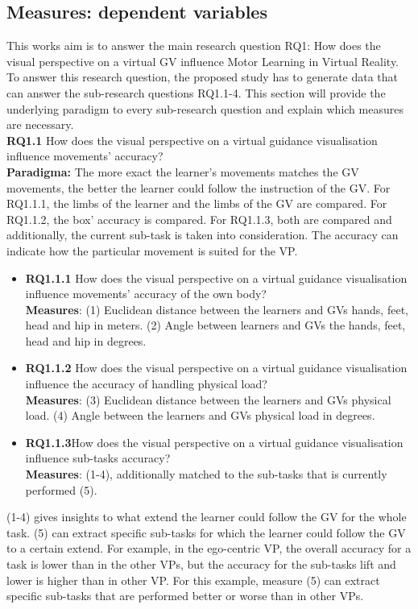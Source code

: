 \subsection{Measures: dependent variables}
\label{sec:measures}
This works aim is to answer the main research question RQ1: How does the visual perspective on a virtual GV influence Motor Learning in Virtual Reality. To answer this research question, the proposed study has to generate data that can answer the sub-research questions RQ1.1-4. This section will provide the underlying paradigm to every sub-research question and explain which measures are necessary.\\

\textbf{RQ1.1} How does the visual perspective on a virtual guidance visualisation influence movements' accuracy?\\
\textbf{Paradigma:} The more exact the learner's movements matches the GV movements, the better the learner could follow the instruction of the GV. For RQ1.1.1, the limbs of the learner and the limbs of the GV are compared. For RQ1.1.2, the box' accuracy is compared. For RQ1.1.3, both are compared and additionally, the current sub-task is taken into consideration. The accuracy can indicate how the particular movement is suited for the VP.
\begin{itemize}
	\item[] \textbf{RQ1.1.1} How does the visual perspective on a virtual guidance visualisation influence movements' accuracy of the own body?\\
	\textbf{Measures}: (1) Euclidean distance between the learners and GVs hands, feet, head and hip in meters. (2) Angle between learners and GVs the hands, feet, head and hip in degrees.
	
	\item[] \textbf{RQ1.1.2} How does the visual perspective on a virtual guidance visualisation influence the accuracy of handling physical load?\\
	\textbf{Measures}: (3) Euclidean distance between the learners and GVs physical load. (4) Angle between the learners and GVs physical load in degrees.
	
	\item[] \textbf{RQ1.1.3}How does the visual perspective on a virtual guidance visualisation influence sub-tasks accuracy?\\
	\textbf{Measures}: (1-4), additionally matched to the sub-tasks that is currently performed (5).
\end{itemize}	
(1-4) gives insights to what extend the learner could follow the GV for the whole task. (5) can extract specific sub-tasks for which the learner could follow the GV to a certain extend. For example, in the ego-centric VP, the overall accuracy for a task is lower than in the other VPs, but the accuracy for the sub-tasks lift and lower is higher than in other VP. For this example, measure (5) can extract specific sub-tasks that are performed better or worse than in other VPs.\\

